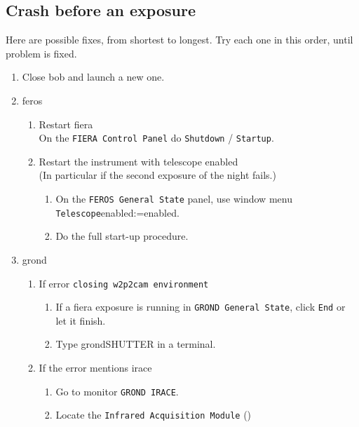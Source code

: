 \documentclass[11pt,fleqn,a4paper]{book}
\makeatletter
\def\menu#1#2{\texttt{#1}\ifx{}#2\else\@for\@x:=#2\do{$\rightarrow$\texttt{\@x}}\fi}
\def\wmenu#1#2{window menu \menu{#1}{#2}}
\makeatother
\begin{document}
\subsection{Crash before an exposure}
\label{sec:expocrash}

Here are possible fixes, from shortest to longest.  Try each one in this
order, until problem is fixed.

\begin{enumerate}
  \item Close \gls{bob} and launch a new one.
  \item \gls{feros}
    \begin{enumerate}
      \item Restart \gls{fiera}\\
            On the \texttt{FIERA Control Panel} do \texttt{Shutdown} / \texttt{Startup}.
            \label{restartfiera}
      \item Restart the instrument with telescope enabled\\
            (In particular if the second exposure of the night fails.)
         \begin{enumerate}
            \item On the \texttt{FEROS \gls{General State}} panel, use \wmenu{Telescope}{enabled}.
            \item Do the full start-up procedure.
         \end{enumerate}
    \end{enumerate}
  \item \gls{grond}
    \begin{enumerate}
       \item If error \texttt{closing \gls{w2p2cam} environment}
       \begin{enumerate}
          \item If a \gls{fiera} exposure is running in \texttt{GROND \gls{General State}}, click \texttt{End} or let it finish.
          \item Type \gls{grondSHUTTER} in a terminal.
       \end{enumerate} 
       \item If the error mentions \gls{irace}
       \begin{enumerate}
            \item Go to monitor \texttt{GROND IRACE}.
            \item Locate the \texttt{Infrared Acquisition Module} ()

\end{enumerate}
\end{enumerate}
\end{enumerate}
\end{document}
